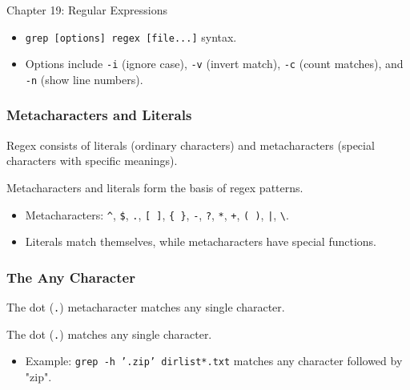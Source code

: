 \begin{notes}{Chapter 19: Regular Expressions}
\begin{highlight}[grep]
    \begin{itemize}
        \item \texttt{grep [options] regex [file...]} syntax.
        \item Options include \texttt{-i} (ignore case), \texttt{-v} (invert match), \texttt{-c} (count matches), and \texttt{-n} (show line numbers).
    \end{itemize}
    
    \end{highlight}
    
    \subsubsection*{Metacharacters and Literals}
    
    Regex consists of literals (ordinary characters) and metacharacters (special characters with specific meanings).
    
    \begin{highlight}
    
    Metacharacters and literals form the basis of regex patterns.
    
    \begin{itemize}
        \item Metacharacters: \texttt{\^}, \texttt{\$}, \texttt{.}, \texttt{[ ]}, \texttt{\{ \}}, \texttt{-}, \texttt{?}, \texttt{*}, \texttt{+}, \texttt{( )}, \texttt{|}, \texttt{\textbackslash}.
        \item Literals match themselves, while metacharacters have special functions.
    \end{itemize}
    
    \end{highlight}
    
    \subsubsection*{The Any Character}
    
    The dot (\texttt{.}) metacharacter matches any single character.
    
    \begin{highlight}
    
    The dot (\texttt{.}) matches any single character.
    
    \begin{itemize}
        \item Example: \texttt{grep -h '.zip' dirlist*.txt} matches any character followed by "zip".
    \end{itemize}
    

\end{highlight}
\end{notes}
